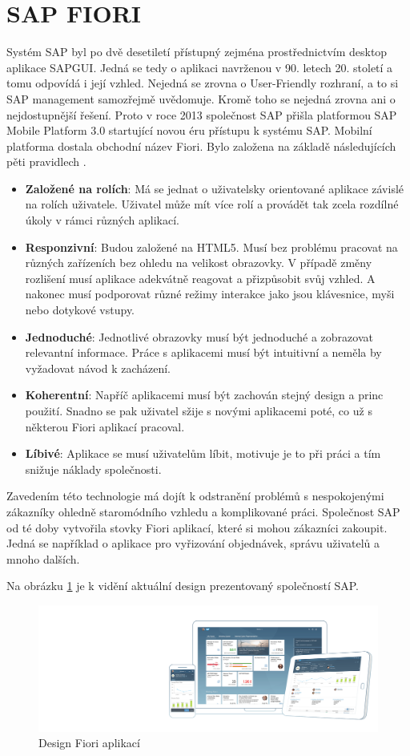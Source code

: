 \documentclass[thesis=M,czech]{FITthesis}[2012/06/26]
\begin{document}
\section{SAP FIORI}
\label{sec:fiori}
Systém SAP byl po dvě desetiletí přístupný zejména prostřednictvím desktop aplikace SAPGUI. Jedná se tedy o aplikaci navrženou v 90. letech 20. století a tomu odpovídá i její vzhled. Nejedná se zrovna o User-Friendly rozhraní, a to si SAP management samozřejmě uvědomuje. Kromě toho se nejedná zrovna ani o nejdostupnější řešení. Proto v roce 2013 společnost SAP přišla platformou SAP Mobile Platform 3.0 startující novou éru přístupu k systému SAP. Mobilní platforma dostala obchodní název Fiori. Bylo založena na základě následujících pěti pravidlech \cite{sap_fiori}.
\begin{itemize}
	\item
	\textbf{Založené na rolích}: Má se jednat o uživatelsky orientované aplikace závislé na rolích uživatele. Uživatel může mít více rolí a provádět tak zcela rozdílné úkoly v rámci různých aplikací.  
	\item
	\textbf{Responzivní}: Budou založené na HTML5. Musí bez problému pracovat na různých zařízeních bez ohledu na velikost obrazovky. V případě změny rozlišení musí aplikace adekvátně reagovat a přizpůsobit svůj vzhled. A nakonec musí podporovat různé režimy interakce jako jsou klávesnice, myši nebo dotykové vstupy.
	\item
	\textbf{Jednoduché}: Jednotlivé obrazovky musí být jednoduché a zobrazovat relevantní informace. Práce s aplikacemi musí být intuitivní a neměla by vyžadovat návod k zacházení.
	\item
	\textbf{Koherentní}: Napříč aplikacemi musí být zachován stejný design a princ použití. Snadno se pak uživatel sžije s novými aplikacemi poté, co už s některou Fiori aplikací pracoval.
	\item
	\textbf{Líbivé}: Aplikace se musí uživatelům líbit, motivuje je to při práci a tím snižuje náklady společnosti.
\end{itemize} 	
Zavedením této technologie má dojít k odstranění problémů s nespokojenými zákazníky ohledně staromódního vzhledu a komplikované práci. Společnost SAP od té doby vytvořila stovky Fiori aplikací, které si mohou zákazníci zakoupit. Jedná se například o aplikace pro vyřizování objednávek, správu uživatelů a mnoho dalších. 

Na obrázku \ref{img:fiori_design} je k vidění aktuální design prezentovaný společností SAP.
\begin{figure}[H]
	\centering
	\includegraphics[width=1\textwidth]{images/fiori}
	\caption{Design Fiori aplikací \cite{sap_fiori}}
	\label{img:fiori_design}
\end{figure}
\end{document}
